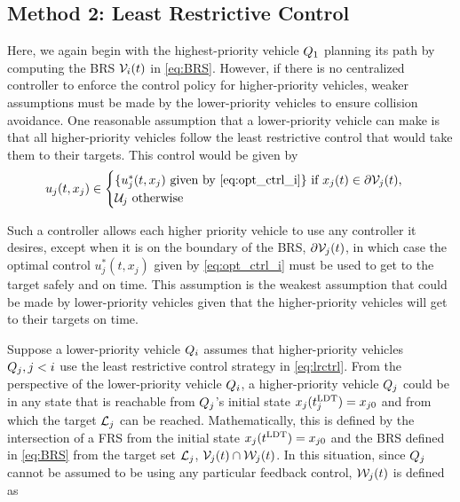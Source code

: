 \subsection{Method 2: Least Restrictive Control \label{sec:lrc}}
Here, we again begin with the highest-priority vehicle $Q_1$ planning its path by computing the BRS $\mathcal{V}_i(t)$ in \eqref{eq:BRS}. However, if there is no centralized controller to enforce the control policy for higher-priority vehicles, weaker assumptions must be made by the lower-priority vehicles to ensure collision avoidance. One reasonable assumption that a lower-priority vehicle can make is that all higher-priority vehicles follow the least restrictive control that would take them to their targets. This control would be given by 
\vspace{-0.4em}
\begin{equation}
\label{eq:lrctrl} %
u_j(t, x_j)\in \begin{cases} \{u_j^*(t, x_j) \text{ given by } \eqref{eq:opt_ctrl_i}\} \text{ if } x_j(t)\in \partial \brs_j(t), \\
\cset_j  \text{ otherwise}
\end{cases}
\end{equation}

Such a controller allows each higher priority vehicle to use any controller it desires, except when it is on the boundary of the BRS, $\partial \mathcal{V}_j(t)$, in which case the optimal control $u_j^*(t, x_j)$ given by \eqref{eq:opt_ctrl_i} must be used to get to the target safely and on time. This assumption is the weakest assumption that could be made by lower-priority vehicles given that the higher-priority vehicles will get to their targets on time.

Suppose a lower-priority vehicle $Q_i$ assumes that higher-priority vehicles $Q_j, j < i$ use the least restrictive control strategy in \eqref{eq:lrctrl}. From the perspective of the lower-priority vehicle $Q_i$, a higher-priority vehicle $Q_j$ could be in any state that is reachable from $Q_j$'s initial state $x_j(t^\text{LDT}_j) = x_{j0}$ and from which the target $\mathcal{L}_j$ can be reached. Mathematically, this is defined by the intersection of a FRS from the initial state $x_j(t^\text{LDT})=x_{j0}$ and the BRS defined in \eqref{eq:BRS} from the target set $\mathcal{L}_j$, $\mathcal{V}_j(t) \cap \mathcal{W}_j(t)$. In this situation, since $Q_j$ cannot be assumed to be using any particular feedback control, $\mathcal{W}_j(t)$ is defined as
\vspace{-0.4em}

